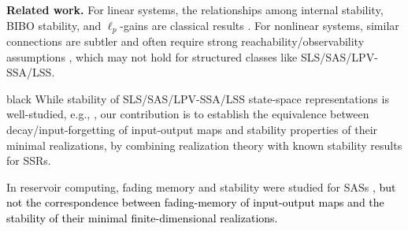 \documentclass[journal,twoside,web]{ieeecolor}
\newtheorem{Notation}{Notation}[section]
\begin{document}
%
\textbf{Related work.}
  For linear systems, the relationships among internal stability, BIBO stability, and $\ell_p$-gains are classical results \cite{Cal:Des}. For nonlinear systems, similar connections are subtler and often require strong reachability/observability assumptions \cite{WillemsStabOld,FROMION1996243,van19922,HILL1980327,MoylanCounterExamples,478341}, which may not hold for structured classes like SLS/SAS/LPV-SSA/LSS.
  \begin{color}{black}
  While stability of SLS/SAS/LPV-SSA/LSS state-space representations is well-studied, e.g., \cite{Chitour1,RJungers,IanMorris2022,Protasov2022,mason2023,Toth1,Sun:Book},
  our contribution is to establish the equivalence between decay/input-forgetting of input-output maps
  and stability properties of their minimal realizations, %
  by combining realization theory with known stability results for SSRs.
  \end{color}
  In reservoir computing, 
  fading memory and stability 
  were studied for SASs \cite{Ortega4,Ortega3,Sepulchre1,GONON202110}, 
  \textcolor{black}{but not the correspondence between 
  fading-memory of
  input-output maps and the stability of their
  minimal finite-dimensional realizations. }
  
  



\end{document}
